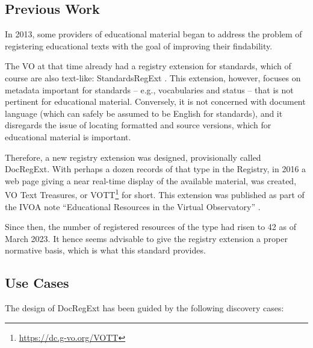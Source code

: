 \documentclass{ivoa}
\begin{document}
\subsection{Previous Work}

In 2013, some providers of educational material began to address the
problem of registering educational texts with the goal of improving
their findability.

The VO at that time already had a registry extension for standards, which of
course are also text-like: StandardsRegExt \citep{2012ivoa.spec.0508H}.  This extension,
however, focuses on metadata important for standards – e.g.,
vocabularies and status – that is not pertinent for educational
material.  Conversely, it is not concerned with document language (which
can safely be assumed to be English for standards), and it disregards
the issue of locating formatted and source versions, which for educational
material is important.

Therefore, a new registry extension was designed, provisionally called
DocRegExt.  With perhaps a dozen records of that type in the Registry,
in 2016 a web page giving a near real-time display of the available
material, was created, VO Text Treasures, or
VOTT\footnote{\url{https://dc.g-vo.org/VOTT}} for short.  This extension was
published as part of the
IVOA note ``Educational Resources in the Virtual Observatory''
\citep{note:edumatters}.

Since then, the number of registered resources of the type
 had risen to 42 as of March 2023.  It hence seems
advisable to give the registry extension a proper normative basis, which
is what this standard provides.


\subsection{Use Cases}

\label{sect:regext-usecases}

The design of DocRegExt has been guided by the
following discovery cases:
\end{document}
